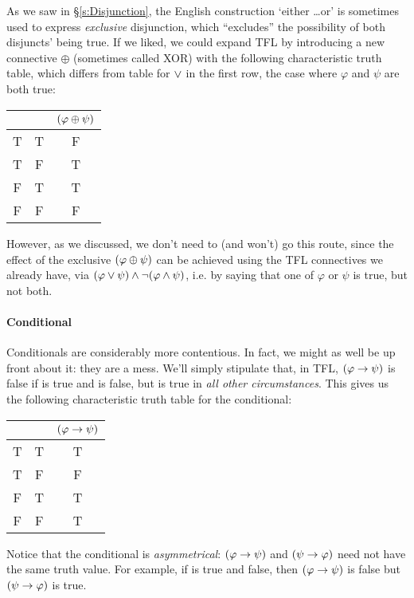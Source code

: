 As we saw in \S\ref{s:Disjunction}, the English construction `either \ldots or' is sometimes used to express \emph{exclusive} disjunction, which ``excludes'' the possibility of both disjuncts' being true.  If we liked, we could expand TFL by introducing a new connective $\oplus$ (sometimes called XOR) with the following characteristic truth table, which differs from table for $\vee$ in the first row, the case where $\varphi$ and $\psi$ are both true:
\begin{center}
\begin{tabular}{c c|c}
\meta{\varphi} & \meta{\psi} & $(\mathcal{\varphi}\oplus\mathcal{\psi})$ \\
\hline
T & T & F\\
T & F & T\\
F & T & T\\
F & F & F
\end{tabular}
\end{center}
However, as we discussed, we don't need to  (and won't) go this route, since the effect of the exclusive $(\mathcal{\varphi} \oplus \mathcal{\psi})$ can be achieved using the TFL connectives we already have, via $(\mathcal{\varphi} \vee \mathcal{\psi}) \wedge \neg(\mathcal{\varphi} \wedge \mathcal{\psi})$, i.e. by saying that one of $\varphi$ or $\psi$ is true, but not both.

\paragraph{Conditional} Conditionals are considerably more contentious.  In fact, we might as well be up front about it: they are a mess.   We'll simply stipulate that, in TFL,  $(\mathcal{\varphi}\rightarrow\mathcal{\psi})$ is false if \meta{\varphi} is true and \meta{\psi} is false, but is true in \emph{all other circumstances}. This gives us the following characteristic truth table for the conditional:
\begin{center}
\begin{tabular}{c c|c}
\meta{\varphi} & \meta{\psi} & $(\mathcal{\varphi}\rightarrow\mathcal{\psi})$\\
\hline
T & T & T\\
T & F & F\\
F & T & T\\
F & F & T
\end{tabular}
\end{center}
Notice that the conditional is \emph{asymmetrical}: $(\mathcal{\varphi}\rightarrow\mathcal{\psi})$ and $(\mathcal{\psi} \rightarrow \mathcal{\varphi})$ need not have the same truth value.  For example, if \meta{\varphi} is true and \meta{\psi} false, then $(\mathcal{\varphi}\rightarrow\mathcal{\psi})$ is false but $(\mathcal{\psi} \rightarrow \mathcal{\varphi})$ is true.

